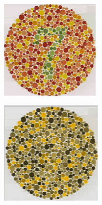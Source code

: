 \documentclass[10pt,twocolumn,letterpaper]{article}
\begin{document}
\begin{figure}[h]
  \centering
  \begin{subfigure}{0.23\textwidth}
    \includegraphics[width=\textwidth]{isihara1.png}
    \caption{}
  \end{subfigure}
  \begin{subfigure}{0.23\textwidth}
    \includegraphics[width=\textwidth]{isihara2.png}

\end{subfigure}
\end{figure}
\end{document}
